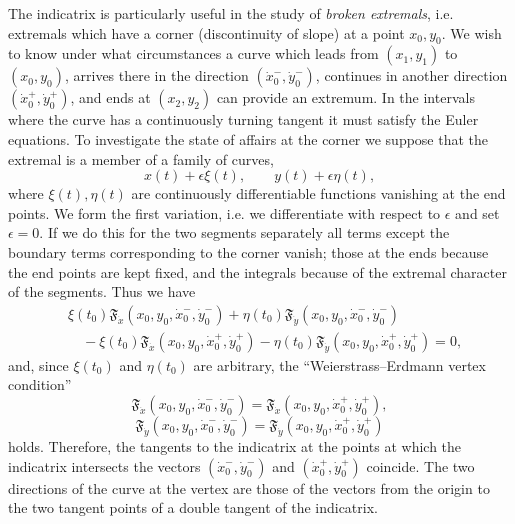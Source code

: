 The indicatrix is particularly useful in the study of \emph{broken extremals}, i.e. extremals which have a corner (discontinuity of slope) at a point $x_0,y_0$. We wish to know under what circumstances a curve which leads from $(x_1,y_1)$ to $(x_0,y_0)$, arrives there in the direction $(\dot x_0^{-},\dot y_0^{-})$, continues in another direction $(\dot x_0^{+},\dot y_0^{+})$, and ends at $(x_2,y_2)$ can provide an extremum. In the intervals where the curve has a continuously turning tangent it must satisfy the Euler equations. To investigate the state of affairs at the corner we suppose that the extremal is a member of a family of curves,
\[
x(t)+\epsilon\xi(t),\qquad y(t)+\epsilon\eta(t),
\]
where $\xi(t),\eta(t)$ are continuously differentiable functions vanishing at the end points. We form the first variation, i.e. we differentiate with respect to $\epsilon$ and set $\epsilon=0$. If we do this for the two segments separately all terms except the boundary terms corresponding to the corner vanish; those at the ends because the end points are kept fixed, and the integrals because of the extremal character of the segments. Thus we have
\begin{align*}
&\xi(t_0)\mathfrak F_{\dot x}(x_0,y_0,\dot x_0^{-},\dot y_0^{-})
+\eta(t_0)\mathfrak F_{\dot y}(x_0,y_0,\dot x_0^{-},\dot y_0^{-})\\
&\quad-\xi(t_0)\mathfrak F_{\dot x}(x_0,y_0,\dot x_0^{+},\dot y_0^{+})
-\eta(t_0)\mathfrak F_{\dot y}(x_0,y_0,\dot x_0^{+},\dot y_0^{+})=0,
\end{align*}
and, since $\xi(t_0)$ and $\eta(t_0)$ are arbitrary, the ``Weierstrass--Erdmann vertex condition''
\[
\mathfrak F_{\dot x}(x_0,y_0,\dot x_0^{-},\dot y_0^{-})
=\mathfrak F_{\dot x}(x_0,y_0,\dot x_0^{+},\dot y_0^{+}),
\]
\[
\mathfrak F_{\dot y}(x_0,y_0,\dot x_0^{-},\dot y_0^{-})
=\mathfrak F_{\dot y}(x_0,y_0,\dot x_0^{+},\dot y_0^{+})
\]
holds. Therefore, the tangents to the indicatrix at the points at which the indicatrix intersects the vectors $(\dot x_0^{-},\dot y_0^{-})$ and $(\dot x_0^{+},\dot y_0^{+})$ coincide. The two directions of the curve at the vertex are those of the vectors from the origin to the two tangent points of a double tangent of the indicatrix.

